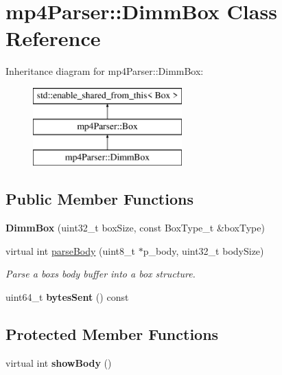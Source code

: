 \hypertarget{classmp4_parser_1_1_dimm_box}{}\section{mp4\+Parser\+::Dimm\+Box Class Reference}
\label{classmp4_parser_1_1_dimm_box}
Inheritance diagram for mp4\+Parser\+::Dimm\+Box\+:\begin{figure}[H]
\begin{center}
\leavevmode
\includegraphics[height=3.000000cm]{classmp4_parser_1_1_dimm_box}
\end{center}
\end{figure}
\subsection*{Public Member Functions}
\begin{DoxyCompactItemize}
\item 
\mbox{\label{classmp4_parser_1_1_dimm_box_ace935082dbd688eba9624532b241cd1c}} 
{\bfseries Dimm\+Box} (uint32\+\_\+t box\+Size, const Box\+Type\+\_\+t \&box\+Type)
\item 
virtual int \mbox{\hyperlink{classmp4_parser_1_1_dimm_box_a9504de9dd02507dc834e7481a0e4cff1}{parse\+Body}} (uint8\+\_\+t $\ast$p\+\_\+body, uint32\+\_\+t body\+Size)
\begin{DoxyCompactList}\small\item\em Parse a box\textquotesingle{}s body buffer into a box structure. \end{DoxyCompactList}\item 
\mbox{\label{classmp4_parser_1_1_dimm_box_a3a5edf8846c770c05558e5dd34a53e19}} 
uint64\+\_\+t {\bfseries bytes\+Sent} () const
\end{DoxyCompactItemize}
\subsection*{Protected Member Functions}
\begin{DoxyCompactItemize}
\item 
\mbox{\label{classmp4_parser_1_1_dimm_box_a45974b46d456ae56e50d7fc14ba3ccb7}} 
virtual int {\bfseries show\+Body} ()
\end{DoxyCompactItemize}
